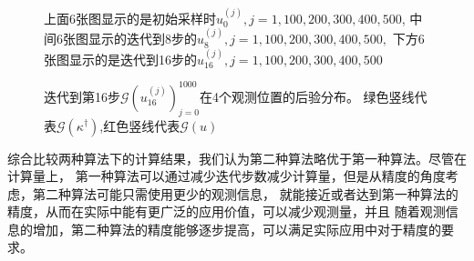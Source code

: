 \documentclass[a4paper,12pt,oneside,CJK]{cctbook}
\theoremstyle{definition}
\numberwithin{equation}{section}
\begin{document}
\begin{figure}
\caption{上面6张图显示的是初始采样时$u_0^{(j)},j=1,100,200,300,400,500$,
中间6张图显示的迭代到8步的$u_8^{(j)},j=1,100,200,300,400,500,$
下方6张图显示的是迭代到16步的$u_{16}^{(j)},j=1,100,200,300,400,500$}\label{fig10}
\end{figure}

\begin{figure}
\caption{迭代到第16步$\mathcal{G}(u_{16}^{(j)})_{j=0}^{1000}$在4个观测位置的后验分布。
绿色竖线代表$\mathcal{G}(\kappa^{\dagger})$,红色竖线代表$\mathcal{G}(u)$}\label{fig11}
\end{figure}

综合比较两种算法下的计算结果，我们认为第二种算法略优于第一种算法。尽管在计算量上，
第一种算法可以通过减少迭代步数减少计算量，但是从精度的角度考虑，第二种算法可能只需使用更少的观测信息，
就能接近或者达到第一种算法的精度，从而在实际中能有更广泛的应用价值，可以减少观测量，并且
随着观测信息的增加，第二种算法的精度能够逐步提高，可以满足实际应用中对于精度的要求。
\end{document}
